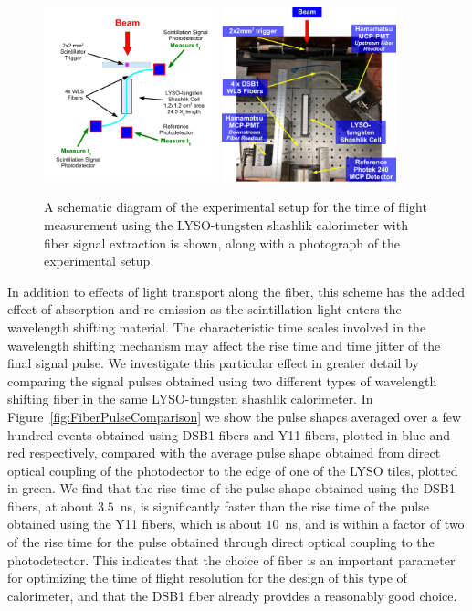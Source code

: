 \documentclass[12pt]{article}
\begin{document}
\begin{figure}[H] \centering
\includegraphics[width=0.45\textwidth]{figs/ShashlikFiberSetupSchematic} 
\includegraphics[width=0.45\textwidth]{figs/ShashlikFiberSetupPhoto} 
\caption{ A schematic diagram of the experimental setup for the
time of flight measurement using the LYSO-tungsten shashlik calorimeter
with fiber signal extraction is shown, along with a photograph of the
experimental setup. } 
\label{fig:ShashlikFiberSetup}
\end{figure}

In addition to effects of light transport along the fiber, 
this scheme has the added effect of absorption and re-emission as 
the scintillation light enters the wavelength shifting material. 
The characteristic time scales involved in the wavelength shifting 
mechanism may affect the rise time and time jitter of the final signal 
pulse. We investigate this particular effect in greater detail by
comparing the signal pulses obtained using two different types
of wavelength shifting fiber in the same LYSO-tungsten shashlik
calorimeter. In Figure~\ref{fig:FiberPulseComparison} we show
the pulse shapes averaged over a few hundred events obtained 
using DSB1 fibers and Y11 fibers, plotted in blue and red respectively,
compared with the average pulse shape obtained from direct optical 
coupling of the photodector to the edge of one of the LYSO tiles, plotted in green.
We find that the rise time of the pulse shape obtained using the 
DSB1 fibers, at about $3.5$~ns, is significantly faster than the rise time
of the pulse obtained using the Y11 fibers, which is about $10$~ns,
and is within a factor of two of the rise time for the pulse obtained 
through direct optical coupling to the photodetector. This indicates
that the choice of fiber is an important parameter for 
optimizing the time of flight resolution for the design of 
this type of calorimeter, and that the DSB1 fiber 
already provides a reasonably good choice.
\end{document}

